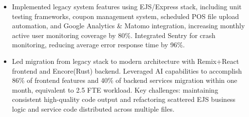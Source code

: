 \documentclass{resume}
\newcommand{\en}[1]{#1}
\newcommand{\zh}[1]{}
\begin{document}
\en{}
\zh{\datedsubsection{\textbf{Absotlute IT}, 澳大利亚}{2024/01 -- 至今}}
\en{}
\zh{\role{INDOS - Independent Online Solutions（线上超市快送系统）}{全栈工程师}}
\begin{itemize}
    \item \en{Implemented legacy system features using EJS/Express stack, including unit testing frameworks, coupon management system, scheduled POS file upload automation, and Google Analytics \& Matomo integration, increasing monthly active user monitoring coverage by 80\%. Integrated Sentry for crash monitoring, reducing average error response time by 96\%.}
          \zh{负责旧版的功能开发 - 例如单元测试，优惠券系统，POS文件的上传的定时任务系统，集成 Google Analytics \& Matomo，月活用户监测覆盖率提升 80\%。集成 Sentry 实现崩溃监控，平均错误响应时间缩短 96\%。}
    \item \en{Led migration from legacy stack to modern architecture with Remix+React frontend and Encore(Rust) backend. Leveraged AI capabilities to accomplish 86\% of frontend features and 40\% of backend services migration within one month, equivalent to 2.5 FTE workload. Key challenges: maintaining consistent high-quality code output and refactoring scattered EJS business logic and service code distributed across multiple files.}
          \zh{主导 Remix+React 前端与 encore(Rust) 后端迁移 - 借助AI能力快速实现86\%的前端功能以及40\%的后端服务的迁移(一个月)。工作量相当于2.5人。难点：持续输出高质量代码以及重构分散在各处的ejs业务逻辑代码和服务代码。}
\end{itemize}
\end{document}
